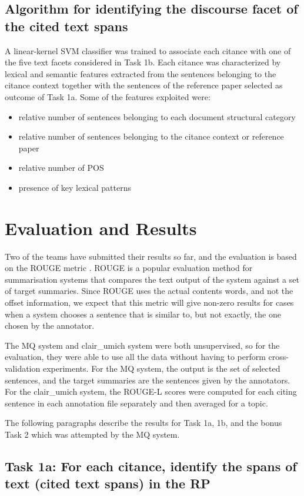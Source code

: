 \documentclass[11pt]{article}
\begin{document}
\subsection{Algorithm for identifying the discourse facet of the cited text spans}
A linear-kernel SVM classifier was trained to associate each citance with one of the five text facets considered in Task 1b. Each citance was characterized by lexical and semantic features extracted from the sentences belonging to the citance context together with the sentences of the reference paper selected as outcome of Task 1a.
Some of the features exploited were:
\begin{itemize}
\item{relative number of sentences belonging to each document structural category}
\item{relative number of sentences belonging to the citance context or reference paper}
\item{relative number of POS}
\item{presence of key lexical patterns}
\end{itemize}

\section{Evaluation and Results}
Two of the teams have submitted their results so far, and the evaluation is based on the ROUGE metric \cite{Lin:2004}. ROUGE is a popular evaluation method for summarisation systems that compares the text output of the system against a set of target summaries. Since ROUGE uses the actual contents words, and not the offset information, we expect that this metric will give non-zero results for cases when a system chooses a sentence that is similar to, but not exactly, the one chosen by the annotator.

The MQ system and clair\_umich system were both unsupervised, so for the evaluation, they were able to use all the data without having to perform cross-validation experiments. For the MQ system, the output is the set of selected sentences, and the target summaries are the sentences given by the annotators.  For the clair\_umich system, the ROUGE-L scores were computed for each citing sentence in each annotation file separately and then averaged for a topic.


The following paragraphs describe the results for Task 1a, 1b, and the bonus Task 2 which was attempted by the MQ system.
\subsection{Task 1a: For each citance, identify the spans of text (cited text spans) in the RP}
\end{document}
